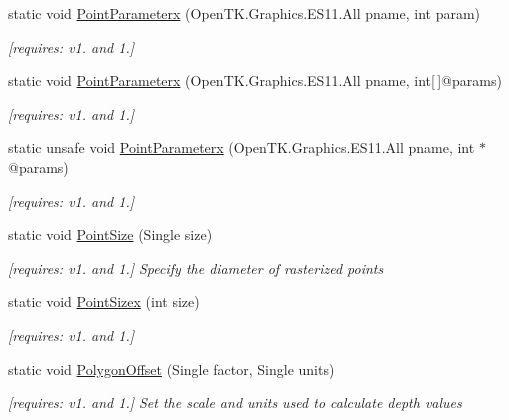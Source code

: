 \begin{DoxyCompactItemize}
static void \hyperlink{class_open_t_k_1_1_graphics_1_1_e_s11_1_1_g_l_a34770094dd0881a86c2fae74f29c5e45}{Point\-Parameterx} (Open\-T\-K.\-Graphics.\-E\-S11.\-All pname, int param)
\begin{DoxyCompactList}\small\item\em \mbox{[}requires\-: v1. and 1.\mbox{]}\end{DoxyCompactList}\item 
static void \hyperlink{class_open_t_k_1_1_graphics_1_1_e_s11_1_1_g_l_a507563a90e9242b7d9de6bbf7a47f5c7}{Point\-Parameterx} (Open\-T\-K.\-Graphics.\-E\-S11.\-All pname, int\mbox{[}$\,$\mbox{]}@params)
\begin{DoxyCompactList}\small\item\em \mbox{[}requires\-: v1. and 1.\mbox{]}\end{DoxyCompactList}\item 
static unsafe void \hyperlink{class_open_t_k_1_1_graphics_1_1_e_s11_1_1_g_l_a3982a0c951ecb976b12ced9552561b29}{Point\-Parameterx} (Open\-T\-K.\-Graphics.\-E\-S11.\-All pname, int $\ast$@params)
\begin{DoxyCompactList}\small\item\em \mbox{[}requires\-: v1. and 1.\mbox{]}\end{DoxyCompactList}\item 
static void \hyperlink{class_open_t_k_1_1_graphics_1_1_e_s11_1_1_g_l_a9ba4f6a0e088603ac520422a55e075c8}{Point\-Size} (Single size)
\begin{DoxyCompactList}\small\item\em \mbox{[}requires\-: v1. and 1.\mbox{]} Specify the diameter of rasterized points \end{DoxyCompactList}\item 
static void \hyperlink{class_open_t_k_1_1_graphics_1_1_e_s11_1_1_g_l_aa62c52e349ffc6591d3bd56670eb3ab3}{Point\-Sizex} (int size)
\begin{DoxyCompactList}\small\item\em \mbox{[}requires\-: v1. and 1.\mbox{]}\end{DoxyCompactList}\item 
static void \hyperlink{class_open_t_k_1_1_graphics_1_1_e_s11_1_1_g_l_afb2550a36f9c145ed5b518eb4081739e}{Polygon\-Offset} (Single factor, Single units)
\begin{DoxyCompactList}\small\item\em \mbox{[}requires\-: v1. and 1.\mbox{]} Set the scale and units used to calculate depth values \end{DoxyCompactList}\item 

\end{DoxyCompactItemize}
